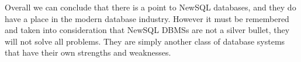 \documentclass[10pt, conference]{IEEEtran}
\begin{document}
Overall we can conclude that there is a point to NewSQL databases, and they do have a place in the modern database industry. However it must be remembered and taken into consideration that NewSQL DBMSs are not a silver bullet, they will not solve all problems. They are simply another class of database systems that have their own strengths and weaknesses.



\end{document}
